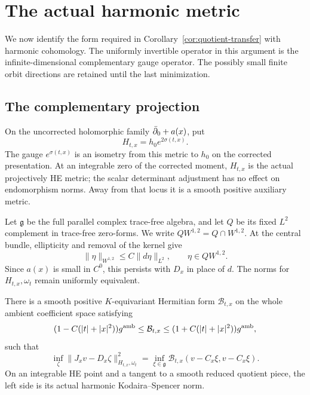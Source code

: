 \section{The actual harmonic metric}\label{sec:harmonic}

We now identify the form required in Corollary~\ref{cor:quotient-transfer}
with harmonic cohomology. The uniformly invertible operator in this
argument is the infinite-dimensional complementary gauge operator.
The possibly small finite orbit directions are retained until the
last minimization.

\subsection{The complementary projection}

On the uncorrected holomorphic family $\bar\partial_0+a(x)$, put
\begin{equation}\label{eq:transported-metric}
H_{t,x}=h_0e^{2\sigma(t,x)}.
\end{equation}
The gauge $e^{\sigma(t,x)}$ is an isometry from this metric to $h_0$
on the corrected presentation. At an integrable zero of the corrected
moment, $H_{t,x}$ is the actual projectively HE metric; the scalar
determinant adjustment has no effect on endomorphism norms. Away
from that locus it is a smooth positive auxiliary metric.

Let $\mathfrak g$ be the full parallel complex trace-free algebra, and
let $Q$ be its fixed $L^2$ complement in trace-free zero-forms.
We write $QW^{1,2}=Q\cap W^{1,2}$.
At the central bundle, ellipticity and removal of the kernel give
\begin{equation}\label{eq:complement-gap}
\|\eta\|_{W^{1,2}}\le C\|d\eta\|_{L^2},\qquad
\eta\in QW^{1,2}.
\end{equation}
Since $a(x)$ is small in $C^0$, this persists with $D_x$ in place
of $d$. The norms for $H_{t,x},\omega_t$ remain uniformly equivalent.

\begin{proposition}\label{prop:ambient-harmonic}
There is a smooth positive $K$-equivariant Hermitian form
$\mathcal B_{t,x}$ on the whole ambient coefficient space satisfying
\begin{equation}\label{eq:B-estimate}
(1-C(|t|+|x|^2))g^{\rm amb}
\le\mathcal B_{t,x}\le
(1+C(|t|+|x|^2))g^{\rm amb},
\end{equation}
such that
\begin{equation}\label{eq:full-infimum}
\inf_{\zeta}\|J_xv-D_x\zeta\|_{H_{t,x},\omega_t}^2
=\inf_{\xi\in\mathfrak g}
\mathcal B_{t,x}(v-C_x\xi,v-C_x\xi).
\end{equation}
On an integrable HE point and a tangent to a smooth reduced quotient
piece, the left side is its actual harmonic Kodaira--Spencer norm.
\end{proposition}

